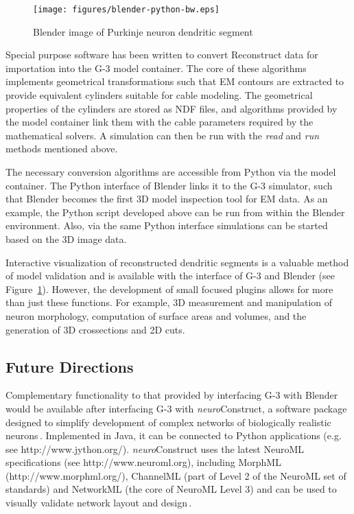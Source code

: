 \documentclass[12pt]{article}
\begin{document}
\begin{figure}[ht]
  \centering
    \texttt{[image: figures/blender-python-bw.eps]}
  \caption{Blender image of Purkinje neuron dendritic segment}
  \label{fig:cbi-blender}
\end{figure}


Special purpose software has been written to convert Reconstruct data
for importation into the G-3 model container.  The core of these
algorithms implements geometrical transformations such that EM
contours are extracted to provide equivalent cylinders suitable for
cable modeling.  The geometrical properties of the cylinders are
stored as NDF files, and algorithms provided by the model container
link them with the cable parameters required by the mathematical
solvers.  A simulation can then be run with the {\it read} and {\it
  run} methods mentioned above.

The necessary conversion algorithms are accessible from Python via the
model container.  The Python interface of Blender links it to the G-3
simulator, such that Blender becomes the first 3D model inspection
tool for EM data.  As an example, the Python script developed above
can be run from within the Blender environment.  Also, via the same
Python interface simulations can be started based on the 3D image
data.

Interactive visualization of reconstructed dendritic segments is a
valuable method of model validation and is available with the
interface of G-3 and Blender (see Figure~\ref{fig:cbi-blender}).
However, the development of small focused plugins allows for more than
just these functions. For example, 3D measurement and manipulation of
neuron morphology, computation of surface areas and volumes, and the
generation of 3D crossections and 2D cuts.

\subsection{Future Directions}
Complementary functionality to that provided by interfacing G-3 with
Blender would be available after interfacing G-3 with {\it
  neuro}Construct, a software package designed to simplify development
of complex networks of biologically realistic
neurons\,\cite{gleeson05:_build_networ_model}.  Implemented in Java,
it can be connected to Python applications (e.g. see
http://www.jython.org/).  {\it neuro}Construct uses the latest NeuroML
specifications (see http://www.neuroml.org), including MorphML
(http://www.morphml.org/), ChannelML (part of Level 2 of the NeuroML
set of standards) and NetworkML (the core of NeuroML Level 3) and can
be used to visually validate network layout and
design\,\cite{crook07:_morph}.
\end{document}
